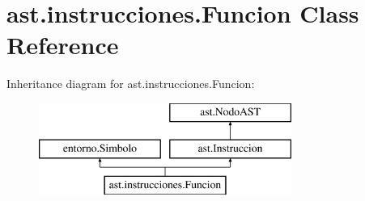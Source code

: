 \hypertarget{classast_1_1instrucciones_1_1_funcion}{}\section{ast.\+instrucciones.\+Funcion Class Reference}
\label{classast_1_1instrucciones_1_1_funcion}
Inheritance diagram for ast.\+instrucciones.\+Funcion\+:\begin{figure}[H]
\begin{center}
\leavevmode
\includegraphics[height=3.000000cm]{classast_1_1instrucciones_1_1_funcion}
\end{center}
\end{figure}
